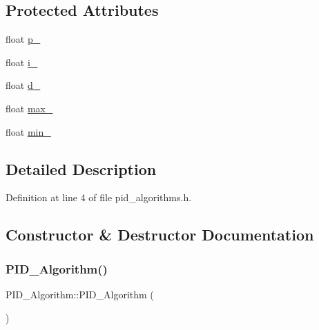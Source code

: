 \subsection*{Protected Attributes}
\begin{DoxyCompactItemize}
\item 
float \mbox{\hyperlink{class_p_i_d___algorithm_a6e988e5351fd21eb2227613ad8684d5c}{p\+\_\+}}
\item 
float \mbox{\hyperlink{class_p_i_d___algorithm_a707b421fc0ef05719c1a3072de4ef607}{i\+\_\+}}
\item 
float \mbox{\hyperlink{class_p_i_d___algorithm_a30ae77c089ff5638d5b3e8203add778d}{d\+\_\+}}
\item 
float \mbox{\hyperlink{class_p_i_d___algorithm_a1e0d5415bea59ae3f908b06c45bd0dd8}{max\+\_\+}}
\item 
float \mbox{\hyperlink{class_p_i_d___algorithm_a4ba021193490b2023b0fab0f5ed5946c}{min\+\_\+}}
\end{DoxyCompactItemize}


\subsection{Detailed Description}


Definition at line 4 of file pid\+\_\+algorithms.\+h.



\subsection{Constructor \& Destructor Documentation}
\mbox{\label{class_p_i_d___algorithm_a77e1b4df4f9605df9373deb336c47987}} 
\subsubsection{\texorpdfstring{PID\_Algorithm()}{PID\_Algorithm()}\hspace{0.1cm}{\footnotesize\ttfamily [1/2]}}
{\footnotesize\ttfamily P\+I\+D\+\_\+\+Algorithm\+::\+P\+I\+D\+\_\+\+Algorithm (\begin{DoxyParamCaption}{ }\end{DoxyParamCaption})\hspace{0.3cm}{\ttfamily [inline]}}



